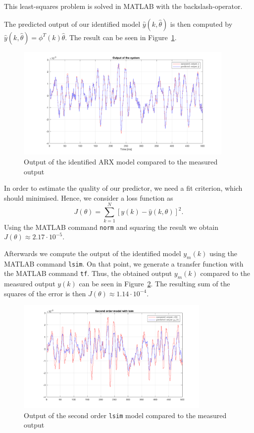 \documentclass{scrartcl}
\begin{document}
This least-squares problem is solved in MATLAB with the backslash-operator.

The predicted output of our identified model $\hat{y}(k,\hat{\theta})$ is then computed by 
$\hat{y}(k,\hat{\theta}) = \phi^{T} (k) \hat{\theta}$. The result can be seen in Figure~\ref{fig:output_arx}.

\begin{figure}[h]
	\centering
	\includegraphics[height=5.5cm]{figures/output_arx.png}
	\caption{Output of the identified ARX model compared to the measured output }\label{fig:output_arx}
\end{figure}

In order to estimate the quality of our predictor, we need a fit criterion, which should minimised. Hence, we consider a loss function as 
\begin{equation}\label{eq:J}
	J(\theta) = \sum\limits_{k=1}^N \left[y(k) - \hat{y}(k,\theta) \right]^2.
\end{equation}
Using the MATLAB command \texttt{norm} and squaring the result we obtain $ J(\theta) \approx 2.17 \cdot 10^{-5}$. 

Afterwards we compute the output of the identified model $y_m(k)$ using the MATLAB command \texttt{lsim}. On that point, we generate a transfer function with the MATLAB command \texttt{tf}. Thus, the obtained output $y_m(k)$ compared to the measured output $y(k)$ can be seen in Figure~\ref{fig:output_lsim2}.
The resulting sum of the squares of the error is then $ J(\theta) \approx 1.14 \cdot 10^{-4}$. 

\begin{figure}[h]
	\centering
	\includegraphics[height=5.5cm]{figures/output_lsim2.png}
	\caption{Output of the second order \texttt{lsim} model compared to the measured output}\label{fig:output_lsim2}
\end{figure}
\end{document}
